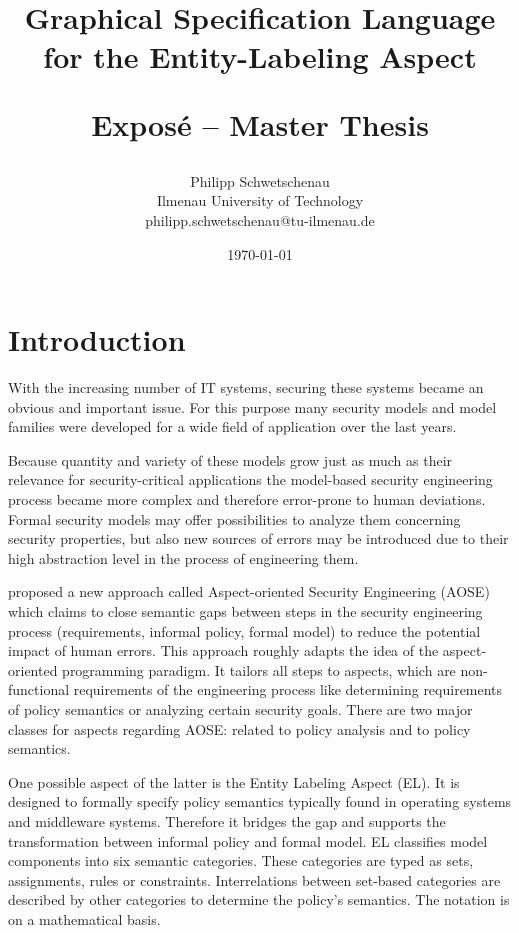 \documentclass[12pt,a4paper]{article}
\begin{document}
\title{{\bf Graphical Specification Language for the Entity-Labeling Aspect} \\ 
\begin{large}Exposé -- Master Thesis\end{large}
}
\author{
	Philipp Schwetschenau \\
	Ilmenau University of Technology \\
	philipp.schwetschenau@tu-ilmenau.de
}
\date{\today}

\maketitle

\section{Introduction} 
With the increasing number of IT systems, securing these systems became an obvious and important issue.
For this purpose many security models and model families were developed for a wide field of application over the last years.

Because quantity and variety of these models grow just as much as their relevance for security-critical applications the model-based security engineering process became more complex and therefore error-prone to human deviations.
Formal security models may offer possibilities to analyze them concerning security properties, but also new sources of errors may be introduced due to their high abstraction level in the process of engineering them.

\cite{Amthor18} proposed a new approach called Aspect-oriented Security Engineering (AOSE) which claims to close semantic gaps between steps in the security engineering process (requirements, informal policy, formal model) to reduce the potential impact of human errors.
This approach roughly adapts the idea of the aspect-oriented programming paradigm.
It tailors all steps to aspects, which are non-functional requirements of the engineering process like determining requirements of policy semantics or analyzing certain security goals.
There are two major classes for aspects regarding AOSE: related to policy analysis and to policy semantics.

One possible aspect of the latter is the Entity Labeling Aspect (EL).
It is designed to formally specify policy semantics typically found in operating systems and middleware systems.
Therefore it bridges the gap and supports the transformation between informal policy and formal model.
EL classifies model components into six semantic categories.
These categories are typed as sets, assignments, rules or constraints.
Interrelations between set-based categories are described by other categories to determine the policy's semantics.
The notation is on a mathematical basis.
\end{document}
